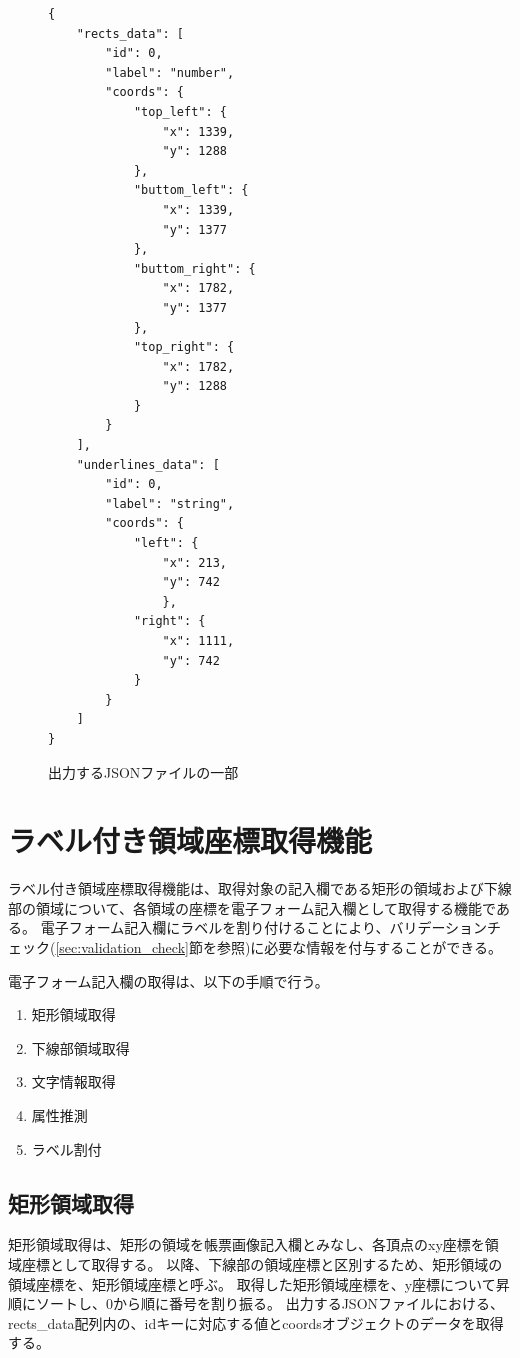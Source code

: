 \lstset{language=}
\begin{figure}[t]
    \begin{lstlisting}
{
    "rects_data": [
        "id": 0, 
        "label": "number",
        "coords": {
            "top_left": {
                "x": 1339,
                "y": 1288
            },
            "buttom_left": {
                "x": 1339,
                "y": 1377
            },
            "buttom_right": {
                "x": 1782,
                "y": 1377
            },
            "top_right": {
                "x": 1782,
                "y": 1288
            }
        }
    ],
    "underlines_data": [
        "id": 0,
        "label": "string",
        "coords": {
            "left": {
                "x": 213,
                "y": 742
                },
            "right": {
                "x": 1111,
                "y": 742
            }
        }
    ]
}
    \end{lstlisting}
    \caption{出力するJSONファイルの一部}\label{fig:example_output_json}
\end{figure}

\section{ラベル付き領域座標取得機能}\label{sec:eform_write_space_obtainment_feature}
ラベル付き領域座標取得機能は、取得対象の記入欄である矩形の領域および下線部の領域について、各領域の座標を電子フォーム記入欄として取得する機能である。
電子フォーム記入欄にラベルを割り付けることにより、バリデーションチェック(\ref{sec:validation_check}節を参照)に必要な情報を付与することができる。

電子フォーム記入欄の取得は、以下の手順で行う。

\begin{enumerate}
    \item 矩形領域取得
    \item 下線部領域取得
    \item 文字情報取得
    \item 属性推測
    \item ラベル割付
\end{enumerate}

\subsection{矩形領域取得}\label{subsec:rect_coords_obtainment}
矩形領域取得は、矩形の領域を帳票画像記入欄とみなし、各頂点のxy座標を領域座標として取得する。
以降、下線部の領域座標と区別するため、矩形領域の領域座標を、矩形領域座標と呼ぶ。
取得した矩形領域座標を、y座標について昇順にソートし、0から順に番号を割り振る。
出力するJSONファイルにおける、rects\_data配列内の、idキーに対応する値とcoordsオブジェクトのデータを取得する。

